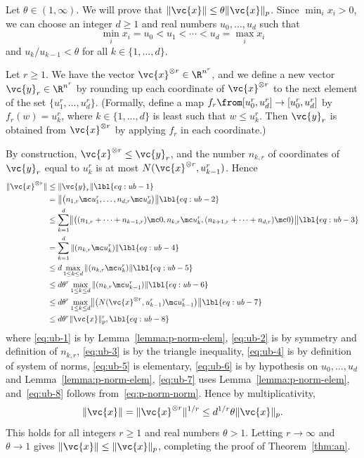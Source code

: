 Let $\theta \in (1, \infty)$.  We will prove that $\|\vc{x}\| \leq
\theta\|\vc{x}\|_p$.  Since $\min_i x_i > 0$, we can choose an integer $d
\geq 1$ and real numbers $u_0, \ldots, u_d$ such that
\[
\min_i x_i = u_0 < u_1 < \cdots < u_d = \max_i x_i
\]
and $u_k/u_{k - 1} < \theta$ for all $k \in \{1, \ldots, d\}$.  

Let $r \geq 1$.  We have the vector $\vc{x}^{\otimes r} \in \R^{n^r}$, and
we define a new vector $\vc{y}_r \in \R^{n^r}$ by rounding up each
coordinate of $\vc{x}^{\otimes r}$ to the next element of the set $\{u_1^r,
\ldots, u_d^r\}$.  (Formally, define a map $f_r \from [u_0^r, u_d^r] \to
      [u_0^r, u_d^r]$ by $f_r(w) = u_k^r$, where $k \in \{1, \ldots, d\}$
      is least such that $w \leq u_k^r$. Then $\vc{y}_r$ is obtained from
      $\vc{x}^{\otimes r}$ by applying $f_r$ in each coordinate.)

By construction, $\vc{x}^{\otimes r} \leq \vc{y}_r$, and the number $n_{k,
  r}$ of coordinates of $\vc{y}_r$ equal to $u_k^r$ is at most
$N(\vc{x}^{\otimes r}, u_{k - 1}^r)$.  Hence
% 
\begin{align}
\|\vc{x}^{\otimes r}\|   &
\leq
\|\vc{y}_r\|    
\lbl{eq:ub-1} \\
&
=
\bigl\|
\bigl(
n_{1, r} \mc u_1^r, \ldots, n_{d, r} \mc u_d^r
\bigr)
\bigr\|
\lbl{eq:ub-2} \\
&
\leq
\sum_{k = 1}^d 
\bigl\|
\bigl(
(n_{1, r} + \cdots + n_{k - 1, r}) \mc 0,
n_{k, r} \mc u_k^r,
(n_{k + 1, r} + \cdots + n_{d, r}) \mc 0
\bigr)
\bigr\|
\lbl{eq:ub-3} \\
&
=
\sum_{k = 1}^d \| (n_{k, r} \mc u_k^r) \|
\lbl{eq:ub-4} \\
&
\leq
d \max_{1 \leq k \leq d} \| (n_{k, r} \mc u_k^r) \|
\lbl{eq:ub-5} \\
&
\leq
d \theta^r \max_{1 \leq k \leq d} \| (n_{k, r} \mc u_{k - 1}^r) \|
\lbl{eq:ub-6} \\
&
\leq
d \theta^r \max_{1 \leq k \leq d} 
\bigl\| \bigl(
N(\vc{x}^{\otimes r}, u_{k - 1}^r) \mc u_{k - 1}^r
\bigr) \bigr\|  
\lbl{eq:ub-7} \\
&
\leq
d \theta^r \|\vc{x}\|_p^r,
\lbl{eq:ub-8}
\end{align}
% 
where \eqref{eq:ub-1} is by
Lemma~\ref{lemma:p-norm-elem}, \eqref{eq:ub-2} is by
symmetry and definition of $n_{k, r}$, \eqref{eq:ub-3} is by the triangle
inequality, \eqref{eq:ub-4} is by definition of system of norms,
\eqref{eq:ub-5} is elementary, \eqref{eq:ub-6} is by hypothesis on $u_0,
\ldots, u_d$ and Lemma~\ref{lemma:p-norm-elem},
\eqref{eq:ub-7} uses Lemma~\ref{lemma:p-norm-elem},
and~\eqref{eq:ub-8} follows from~\eqref{eq:p-norm-norm}.  Hence by
multiplicativity, 
\[
\|\vc{x}\| 
= 
\|\vc{x}^{\otimes r}\|^{1/r} 
\leq 
d^{1/r} \theta \|\vc{x}\|_p.
\]
This holds for all integers $r \geq 1$ and real numbers $\theta > 1$.
Letting $r \to \infty$ and $\theta \to 1$ gives $\|\vc{x}\| \leq
\|\vc{x}\|_p$, completing the proof of Theorem~\ref{thm:an}.

